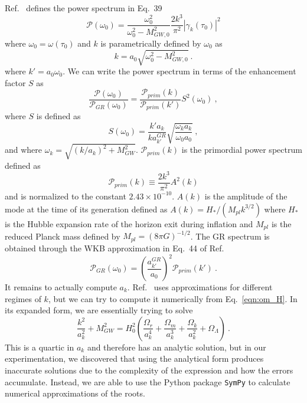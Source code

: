 \documentclass[prd,twocolumn,aps,psfig,nofootinbib,nobibnotes,superscriptaddress,preprintnumbers,times]{revtex4-2}
\begin{document}
Ref.\ \cite{Gumrukcuoglu:2012} defines the power spectrum in Eq.\ 39
\begin{equation}\label{eqn:p_cm}
    \mathcal{P}(\omega_0)= \frac{\omega_0^2}{\omega_0^2 - M_{GW,0}^2}\frac{2k^3}{\pi^2}|\gamma_k(\tau_0)|^2
\end{equation}
where $\omega_0 = \omega(\tau_0)$ and $k$ is parametrically defined by $\omega_0$ as
\begin{equation}\label{eqn:k}
    k = a_0 \sqrt{\omega_0^2 -  M_{GW,0}^2} \ .
\end{equation}
where $k' = a_0 \omega_0$. We can write the power spectrum in terms of the enhancement factor $S$ as
\begin{equation}\label{eqn:p_enhance}
    \frac{\mathcal{P}(\omega_0)}{\mathcal{P}_{GR}(\omega_0)} = \frac{\mathcal{P}_{prim}(k)}{\mathcal{P}_{prim}(k')}S^2(\omega_0)\ ,
\end{equation}
where $S$ is defined as 
\begin{equation}\label{eqn:s}
    S(\omega_0) = \frac{k' a_k}{k a_{k'}^{GR}} \sqrt{\frac{\omega_k a_k}{\omega_0 a_0}}\ ,
\end{equation}
and where $\omega_k = \sqrt{(k/a_k)^2 + M_{GW}^2}$. $\mathcal{P}_{prim}(k)$ is the primordial power spectrum defined as 
\begin{equation}\label{eqn:p_prim}
    \mathcal{P}_{prim}(k) \equiv \frac{2k^3}{\pi^2}A^2(k)
\end{equation}and is normalized to the constant $2.43\times 10^{-10}$. $A(k)$ is the amplitude of the mode at the time of its generation defined as $A(k) = H_*/(M_{pl} k^{3/2})$ where $H_*$ is the Hubble expansion rate of the horizon exit during inflation and $M_{pl}$ is the reduced Planck mass defined by $M_{pl} = (8\pi G)^{-1/2}$. The GR spectrum is obtained through the WKB approximation in Eq.\ 44 of Ref.\ \cite{Gumrukcuoglu:2012}
\begin{equation}\label{eqn:p_gr}
    \mathcal{P}_{GR}(\omega_0) =  \left( \frac{a_{k'}^{GR}}{a_0}\right)^2 \mathcal{P}_{prim}(k')\ .
\end{equation}
It remains to actually compute $a_k$. Ref.\ \cite{Gumrukcuoglu:2012} uses approximations for different regimes of $k$, but we can try to compute it numerically from Eq.\ \ref{eqn:om_H}. In its expanded form, we are essentially trying to solve 
\begin{equation}\label{eqn:om_H_expanded}
    \frac{k^2}{a_k^2} + M_{GW}^2 = H_0^2\left(\frac{\Omega_r}{a_k^4} + \frac{\Omega_m}{a_k^3}+ \frac{\Omega_k}{a_k^2}+\Omega_\Lambda\right) \ .
\end{equation}This is a quartic in $a_k$ and therefore has an analytic solution, but in our experimentation, we discovered that using the analytical form produces inaccurate solutions due to the complexity of the expression and how the errors accumulate. Instead, we are able to use the Python package \texttt{SymPy} \cite{SymPy:2017} to calculate numerical approximations of the roots.
\end{document}
